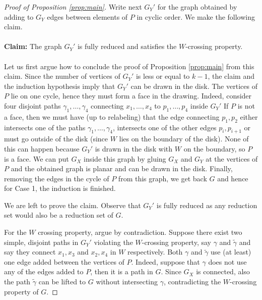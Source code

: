 \documentclass{article}
\numberwithin{equation}{section}
\theoremstyle{definition}
\theoremstyle{definition}
\theoremstyle{remark}
\begin{document}
\begin{appendices}
\begin{proof}[Proof of Proposition \ref{prop:main}]
    Write next $G_Y'$ for the graph obtained by adding to $G_Y$ edges between elements of $P$ in cyclic order. 
    We make the following claim. 
    \\
    \\
    \noindent \textbf{Claim:}
    The graph $G_Y'$ is fully reduced and satisfies the $W$-crossing property. 
    \\
    \\
    \noindent Let us first argue how to conclude the proof of Proposition \ref{prop:main} from this claim. 
    Since the number of vertices of $G_Y'$ is less or equal to $k -1$, 
    the claim and the induction hypothesis imply that $G_Y'$ can be drawn in the disk. 
    The vertices of $P$ lie on one cycle, hence they must form a face in the drawing. 
    Indeed, consider four disjoint paths ${\gamma}_1, \ldots, {\gamma}_4$ connecting 
    $x_1, \ldots, x_4$ to $p_1, \ldots, p_4$ inside $G_Y'$ 
    If $P$ is not a face, then we must have (up to relabeling) 
    that the edge connecting $p_1, p_2$ either intersects one of the paths ${\gamma}_1, \ldots, {\gamma}_4$, 
    intersects one of the other edges $p_i, p_{i+1}$ or must go outside of the disk 
    (since $W$ lies on the boundary of the disk). 
    None of this can happen because $G_Y'$ is drawn in the disk with $W$ on the boundary, so $P$ is a face. 
    We can put $G_X$ inside this graph by gluing $G_X$ and $G_Y$ at the vertices of $P$ 
    and the obtained graph is planar and can be drawn in the disk. 
    Finally, removing the edges in the cycle of $P$ from this graph, we get back $G$ and hence for Case 1, 
	the induction is finished.
    
    We are left to prove the claim. 
	Observe that $G_Y'$ is fully reduced as any reduction set would also be a reduction set of $G$. 
    
    For the $W$ crossing property, argue by contradiction. 
	Suppose there exist two simple, disjoint paths in $G_Y'$ violating the $W$-crossing property, 
	say $\gamma$ and $\widetilde{\gamma}$ and say they connect $x_1, x_3$ and $x_2, x_4$ in $W$ respectively. 
	Both $\gamma$ and $\widetilde{\gamma}$ use (at least) one edge added between the vertices of $P$. 
	Indeed, suppose that $\gamma$ does not use any of the edges added to $P$, 
	then it is a path in $G$. 
	Since $G_X$ is connected, also the path $\widetilde{\gamma}$ can be lifted to $G$ without intersecting $\gamma$, 
	contradicting the $W$-crossing property of $G$. 


\end{proof}
\end{appendices}
\end{document}

